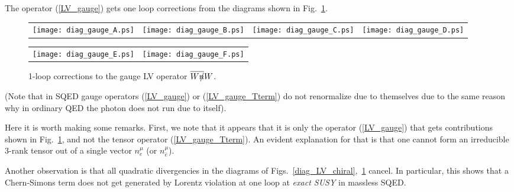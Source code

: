 \documentclass[a4paper,12pt]{article}
\newcommand{\slashed}[1]{\hbox{{$#1$}\llap{$/$}}}
\begin{document}
	The operator (\ref{LV_gauge}) gets one loop corrections from 
	the diagrams shown in 
Fig.~\ref{diag_LV_gauge}.
\begin{figure}[h]
\caption{\label{diag_LV_gauge}
        1-loop corrections to the gauge LV operator 
	$ \overline{W\slashed{n}} W $.
}
\begin{center}
\begin{tabular}{cccc}
\texttt{[image: diag\_gauge\_A.ps]}
&
\texttt{[image: diag\_gauge\_B.ps]}
&
\texttt{[image: diag\_gauge\_C.ps]} 
&
\texttt{[image: diag\_gauge\_D.ps]}
\end{tabular}
\begin{tabular}{cc}
\texttt{[image: diag\_gauge\_E.ps]}
&
\texttt{[image: diag\_gauge\_F.ps]}
\end{tabular}
\end{center}
\end{figure}
	(Note that in SQED gauge operators (\ref{LV_gauge}) or
	(\ref{LV_gauge_Tterm}) do not renormalize due to themselves
	due to the same reason why in ordinary QED the photon does not
	run due to itself).
	
	Here it is worth making some remarks.
	First, we note that it appears that it is only the operator
	(\ref{LV_gauge}) that gets contributions shown in
Fig.~\ref{diag_LV_gauge},
	and not the tensor operator (\ref{LV_gauge_Tterm}).
	An evident explanation for that is that one cannot form
	an irreducible 3-rank tensor out of a single vector
	$ n_e^\mu $ (or $ n_{\bar{e}}^\mu $).

	Another observation is that all quadratic divergencies in the
	diagrams of 
Figs.~\ref{diag_LV_chiral},~\ref{diag_LV_gauge}
	cancel. 
	In particular, this shows that a Chern-Simons term does not
	get generated by Lorentz violation at one loop at
	{\it exact SUSY} in massless SQED.
\end{document}
